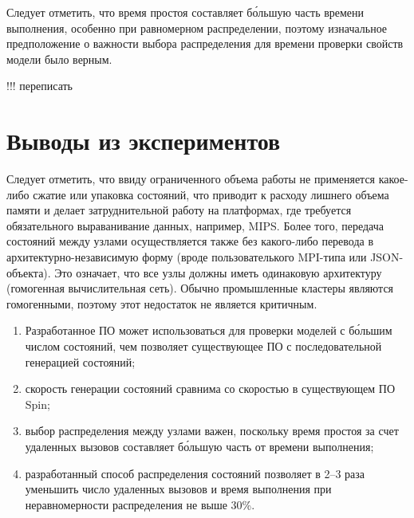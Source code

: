\documentclass[12pt,a4paper,fleqn]{article}
\begin{document}
Следует отметить, что время простоя составляет б\'{о}льшую часть времени выполнения, особенно при
равномерном распределении, поэтому изначальное предположение о важности выбора распределения для
времени проверки свойств модели было верным.

!!! переписать
\section*{Выводы из экспериментов}

Следует отметить, что ввиду ограниченного объема работы не применяется какое-либо сжатие или
упаковка состояний, что приводит к расходу лишнего объема памяти и делает затруднительной работу на
платформах, где требуется обязательного выраванивание данных, например, MIPS. Более того, передача
состояний между узлами осуществляется также без какого-либо перевода в архитектурно-независимую
форму (вроде пользователького MPI-типа или JSON-объекта). Это означает, что все узлы должны иметь
одинаковую архитектуру (гомогенная вычислительная сеть). Обычно промышленные кластеры являются
гомогенными, поэтому этот недостаток не является критичным.

\begin{enumerate}
\item Разработанное ПО может использоваться для проверки моделей с б\'{о}льшим числом
  состояний, чем позволяет существующее ПО с последовательной генерацией состояний;
\item скорость генерации состояний сравнима со скоростью в существующем ПО Spin;
\item выбор распределения между узлами важен, поскольку время простоя за счет удаленных
  вызовов составляет б\'{о}льшую часть от времени выполнения;
\item разработанный способ распределения состояний позволяет в 2--3 раза уменьшить число
  удаленных вызовов и время выполнения при неравномерности распределения не выше 30\%.
\end{enumerate}
\end{document}
